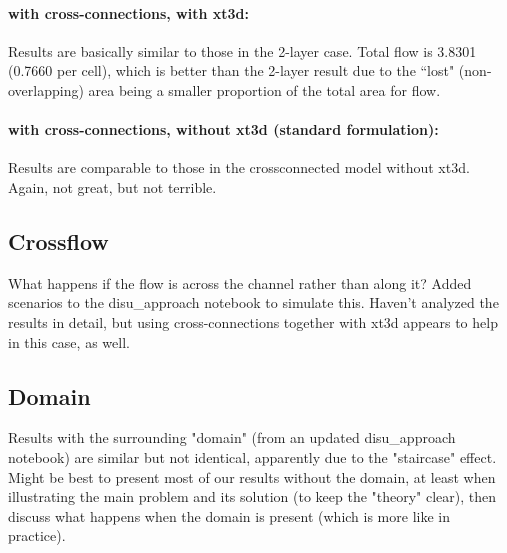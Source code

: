 \documentclass{article}
\begin{document}
\paragraph{with cross-connections, with xt3d:} Results are basically similar to those in the 2-layer case. Total flow is 3.8301 (0.7660 per cell), which is better than the 2-layer result due to the ``lost" (non-overlapping) area being a smaller proportion of the total area for flow.

\paragraph{with cross-connections, without xt3d (standard formulation):} Results are comparable to those in the crossconnected model without xt3d. Again, not great, but not terrible.

\subsection{Crossflow}
What happens if the flow is across the channel rather than along it? Added scenarios to the disu\_approach notebook to simulate this. Haven't analyzed the results in detail, but using cross-connections together with xt3d appears to help in this case, as well.

\subsection{Domain}
Results with the surrounding "domain" (from an updated disu\_approach notebook) are similar but not identical, apparently due to the "staircase" effect. Might be best to present most of our results without the domain, at least when illustrating the main problem and its solution (to keep the "theory" clear), then discuss what happens when the domain is present (which is more like in practice).
\end{document}
